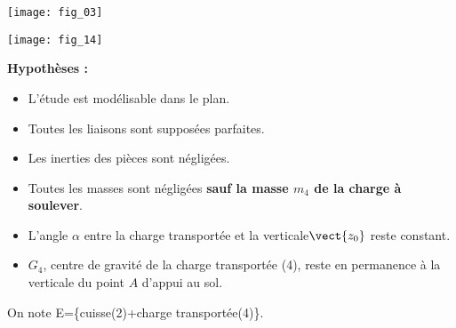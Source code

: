 \begin{center}
\texttt{[image: fig\_03]}
\end{center}


\begin{marginfigure}[-4cm]
\texttt{[image: fig\_14]}
\end{marginfigure}




\noindent\textbf{Hypothèses :}
\begin{itemize}
\item L’étude est modélisable dans le plan.
\item Toutes les liaisons sont supposées parfaites.
\item Les inerties des pièces sont négligées. 
\item Toutes  les masses sont négligées \textbf{sauf la masse $m_4$ de la charge à soulever}.
\item L’angle $\alpha$ entre la charge transportée et la verticale$\vect{z_0}$ reste constant.
\item $G_4$, centre de gravité de la charge transportée (4), reste en permanence à la verticale du point $A$ d’appui au sol.
\end{itemize}



On note E=\{cuisse(2)+charge transportée(4)\}. 

\fi


